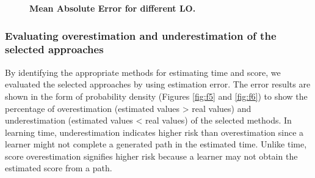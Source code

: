 \documentclass{sig-alternate}
\begin{document}
\newpage
\begin{figure}[H]
\centering
{}\par        
{}
\caption{\textbf{Mean Absolute Error for different LO.}}
\label{fig:f4}
\end{figure}

\subsubsection{Evaluating overestimation and underestimation of the selected approaches}
\label{subsec:evaluatingoverestimation}
\noindent By identifying the appropriate methods for estimating time and score, we evaluated the selected approaches by using estimation error. The error results are shown in the form of probability density (Figures \ref{fig:f5} and \ref{fig:f6}) to show the percentage of overestimation (estimated values > real values) and underestimation (estimated values < real values) of the selected methods. In learning time, underestimation indicates higher risk than overestimation since a learner might not complete a generated path in the estimated time. Unlike time, score overestimation signifies higher risk because a learner may not obtain the estimated score from a path.
\end{document}
